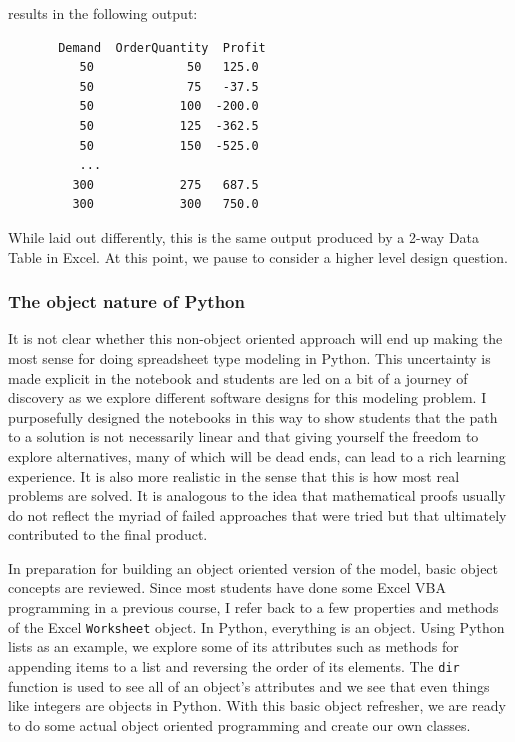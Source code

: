 \documentclass[ited,blindrev]{informs3}              %
\newcommand{\code}[1]{\texttt{#1}}
\begin{document}
results in the following output:

\begin{tcolorbox}
	\begin{verbatim}
	   Demand  OrderQuantity  Profit
	      50             50   125.0
	      50             75   -37.5
	      50            100  -200.0
	      50            125  -362.5
	      50            150  -525.0
	      ...
	     300            275   687.5
	     300            300   750.0
\end{verbatim}	
\end{tcolorbox}

While laid out differently, this is the same output produced by a 2-way Data Table in Excel. At this point, we pause to consider a higher level design question.

\subsubsection{The object nature of Python}

It is not clear whether this non-object oriented approach will end up making the most sense for doing spreadsheet type modeling in Python. This uncertainty is made explicit in the notebook and students are led on a bit of a journey of discovery as we explore different software designs for this modeling problem. I purposefully designed the notebooks in this way to show students that the path to a solution is not necessarily linear and that giving yourself the freedom to explore alternatives, many of which will be dead ends, can lead to a rich learning experience. It is also more realistic in the sense that this is how most real problems are solved. It is analogous to the idea that mathematical proofs usually do not reflect the myriad of failed approaches that were tried but that ultimately contributed to the final product.

In preparation for building an object oriented version of the model, basic object concepts are reviewed. Since most students have done some Excel VBA programming in a previous course, I refer back to a few properties and methods of the Excel \code{Worksheet} object. In Python, everything is an object. Using Python lists as an example, we explore some of its attributes such as methods for appending items to a list and reversing the order of its elements. The \code{dir} function is used to see all of an object's attributes and we see that even things like integers are objects in Python. With this basic object refresher, we are ready to do some actual object oriented programming and create our own classes.
\end{document}
